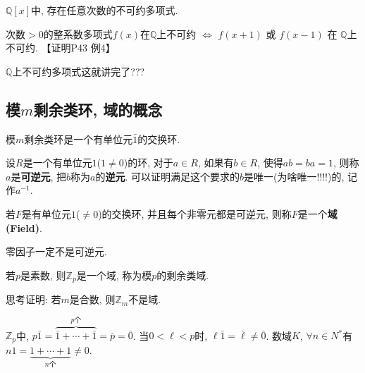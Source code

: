 \begin{Theorem}
$\mathbb{Q}[x]$中, 存在任意次数的不可约多项式.
\end{Theorem}

\begin{Note}
次数$>0$的整系数多项式$f(x)$在$\mathbb{Q}$上不可约 $\iff$ $f(x+1)$ 或 $f(x-1)$ 在 $\mathbb{Q}$上不可约. 【证明P43 例4】
\end{Note}

\begin{Thoughts}$\mathbb{Q}$上不可约多项式这就讲完了??? 
\end{Thoughts}

\subsection{模$m$剩余类环, 域的概念}

\begin{Note}
模$m$剩余类环是一个有单位元$\bar{1}$的交换环.
\end{Note}

\begin{Definition}[可逆元]
设$R$是一个有单位元$1$($1 \neq 0$)的环, 对于$a \in R$, 如果有$b \in R$, 使得$ab = ba = 1$, 则称$a$是\textbf{可逆元}, 把$b$称为$a$的\textbf{逆元}. 可以证明满足这个要求的$b$是唯一(为啥唯一!!!!)的, 记作$a^{-1}$.
\end{Definition}

\begin{Definition}[域]
若$F$是有单位元$1$($\neq 0$)的交换环, 并且每个非零元都是可逆元, 则称$F$是一个\textbf{域(Field)}.
\end{Definition}

\begin{Note}
零因子一定不是可逆元.
\end{Note}

\begin{Theorem}
若$p$是素数, 则$\mathbb{Z}_p$是一个域, 称为模$p$的剩余类域.
\end{Theorem}

\begin{Thoughts}
思考证明: 若$m$是合数, 则$\mathbb{Z}_m$不是域.
\end{Thoughts}

\begin{Note}
$\mathbb{Z}_p$中, $p{}\bar{1} = \overbrace{\bar{1} + \cdots + \bar{1}}^{\text{$p$个}} = \bar{p} = \bar{0}$. 当$0 < \ell < p$时, $\ell \bar{1} = \bar{\ell} \neq \bar{0}$.
数域$K$, $\forall n \in N^*$有$n 1 = \underbrace{1 + \cdots +1}_{\text{$n$个}} \neq 0$. 
\end{Note}

